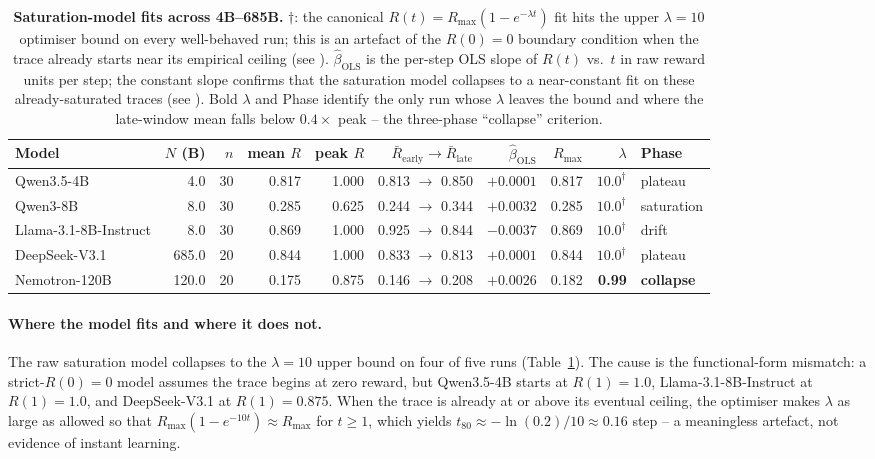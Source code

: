 \begin{table}[t]
  \centering
  \small
  \begin{tabular}{lrrrrrrrrl}
    \toprule
    Model & $N$ (B) & $n$ & mean $R$ & peak $R$ &
           $\bar R_{\text{early}} \!\to\! \bar R_{\text{late}}$ &
           $\hat \beta_{\text{OLS}}$ &
           $R_{\max}$ & $\lambda$ & Phase \\
    \midrule
    Qwen3.5-4B             &   4.0 & 30 & 0.817 & 1.000 & 0.813 $\to$ 0.850 & $+0.0001$ & 0.817 & $10.0^{\dagger}$ & plateau \\
    Qwen3-8B               &   8.0 & 30 & 0.285 & 0.625 & 0.244 $\to$ 0.344 & $+0.0032$ & 0.285 & $10.0^{\dagger}$ & saturation \\
    Llama-3.1-8B-Instruct  &   8.0 & 30 & 0.869 & 1.000 & 0.925 $\to$ 0.844 & $-0.0037$ & 0.869 & $10.0^{\dagger}$ & drift \\
    DeepSeek-V3.1          & 685.0 & 20 & 0.844 & 1.000 & 0.833 $\to$ 0.813 & $+0.0001$ & 0.844 & $10.0^{\dagger}$ & plateau \\
    Nemotron-120B          & 120.0 & 20 & 0.175 & 0.875 & 0.146 $\to$ 0.208 & $+0.0026$ & 0.182 & \textbf{0.99} & \textbf{collapse} \\
    \bottomrule
  \end{tabular}
  \caption{\textbf{Saturation-model fits across 4B--685B.}
    $\dagger$: the canonical
    $R(t) = R_{\max}(1 - e^{-\lambda t})$ fit hits the upper
    $\lambda = 10$ optimiser bound on every well-behaved run; this is
    an artefact of the $R(0) = 0$ boundary condition when the trace
    already starts near its empirical ceiling (see
    ).
    $\hat \beta_{\text{OLS}}$ is the per-step OLS slope of $R(t)$ vs.~$t$
    in raw reward units per step; the constant slope confirms that
    the saturation model collapses to a near-constant fit on these
    already-saturated traces (see ).
    Bold $\lambda$ and Phase identify the only run whose $\lambda$
    leaves the bound and where the late-window mean falls below
    $0.4\times$ peak -- the three-phase ``collapse'' criterion.}
  \label{tab:scaling-fits}
\end{table}

\paragraph{Where the model fits and where it does not.}
\label{par:saturation-discussion}
The raw saturation model collapses to the $\lambda = 10$ upper bound
on four of five runs (Table~\ref{tab:scaling-fits}).  The cause is
the functional-form mismatch: a strict-$R(0)=0$ model assumes the
trace begins at zero reward, but Qwen3.5-4B starts at $R(1)=1.0$,
Llama-3.1-8B-Instruct at $R(1)=1.0$, and DeepSeek-V3.1 at
$R(1)=0.875$.  When the trace is already at or above its eventual
ceiling, the optimiser makes $\lambda$ as large as allowed so that
$R_{\max}(1 - e^{-10 t}) \approx R_{\max}$ for $t \ge 1$, which
yields $t_{80} \approx -\ln(0.2)/10 \approx 0.16$ step -- a
meaningless artefact, not evidence of instant learning.

